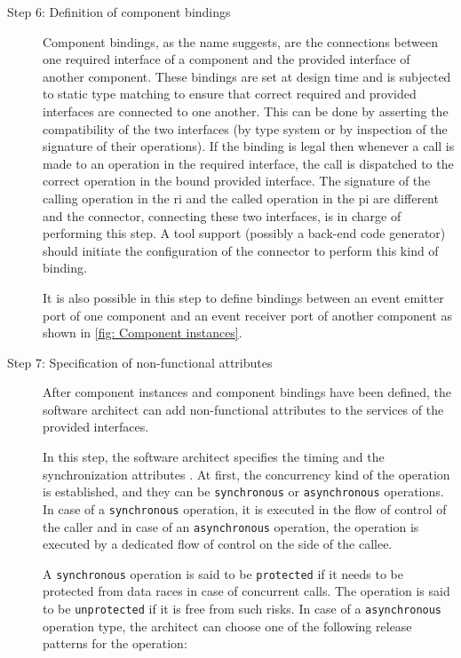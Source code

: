 \begin{description}
\item [Step 6: Definition of component bindings] Component bindings, as the name suggests, are the connections between one required interface of a component and the provided interface of another component. These bindings are set at design time and is subjected to static type matching to ensure that correct required and provided interfaces are connected to one another. This can be done by asserting the compatibility of the two interfaces (by type system or by inspection of the signature of their operations). If the binding is legal then whenever a call is made to an operation in the required interface, the call is dispatched to the correct operation in the bound provided interface. The signature of the calling operation in the \ac{ri} and the called operation in the \ac{pi} are different and the connector, connecting these two interfaces, is in charge of performing this step. A tool support (possibly a back-end code generator) should initiate the configuration of the connector to perform this kind of binding.

It is also possible in this step to define bindings between an event emitter port of one component and an event receiver port of another component as shown in \cref{fig: Component instances}.

\item [Step 7: Specification of non-functional attributes] After component instances and component bindings have been defined, the software architect can add non-functional attributes to the services of the provided interfaces. 

In this step, the software architect specifies the timing and the synchronization attributes \cite{CompBasedProcess}. At first, the concurrency kind of the operation is established, and they can be \texttt{synchronous} or \texttt{asynchronous} operations. In case of a \texttt{synchronous} operation, it is executed in the flow of control of the caller and in case of an \texttt{asynchronous} operation, the operation is executed by a dedicated flow of control on the side of the callee. 

A \texttt{synchronous} operation is said to be \texttt{protected} if it needs to be protected from data races in case of concurrent calls. The operation is said to be \texttt{unprotected} if it is free from such risks. In case of a \texttt{asynchronous} operation type, the architect can choose one of the following release patterns for the operation:


\end{description}
